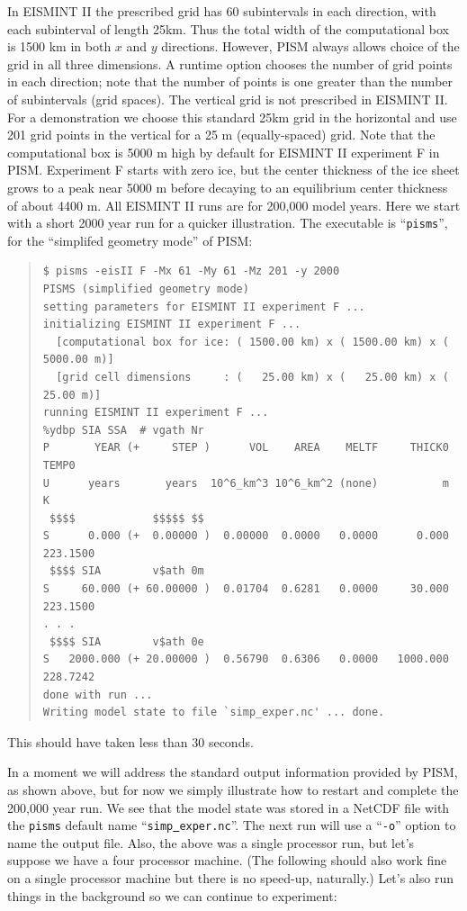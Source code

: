\documentclass[11pt,final]{amsart}
\renewcommand{\t}[1]{\texttt{#1}}
\begin{document}
In EISMINT II the prescribed grid has 60 subintervals in each direction, with each subinterval of length 25km.  Thus the total width of the computational box is 1500 km in both $x$ and $y$ directions.  However, PISM always allows choice of the grid in all three dimensions.  A runtime option chooses the number of grid points in each direction; note that the number of points is one greater than the number of subintervals (grid spaces).  The vertical grid is not prescribed in EISMINT II.  For a demonstration we choose this standard 25km grid in the horizontal and use 201 grid points in the vertical for a 25 m (equally-spaced) grid.  Note that the computational box is 5000 m high by default for EISMINT II experiment F in PISM.  Experiment F starts with zero ice, but the center thickness of the ice sheet grows to a peak near 5000 m before decaying to an equilibrium center thickness of about 4400 m.  All EISMINT II runs are for 200,000 model years.  Here we start with a short 2000 year run for a quicker illustration.  The executable is ``\t{pisms}'', for the ``simplifed geometry mode'' of PISM:

\small\begin{quote}\begin{verbatim}
$ pisms -eisII F -Mx 61 -My 61 -Mz 201 -y 2000
PISMS (simplified geometry mode)
setting parameters for EISMINT II experiment F ... 
initializing EISMINT II experiment F ... 
  [computational box for ice: ( 1500.00 km) x ( 1500.00 km) x ( 5000.00 m)]
  [grid cell dimensions     : (   25.00 km) x (   25.00 km) x (   25.00 m)]
running EISMINT II experiment F ...
%ydbp SIA SSA  # vgath Nr
P       YEAR (+     STEP )      VOL    AREA    MELTF     THICK0     TEMP0
U      years       years  10^6_km^3 10^6_km^2 (none)          m         K
 $$$$            $$$$$ $$
S      0.000 (+  0.00000 )  0.00000  0.0000   0.0000      0.000  223.1500
 $$$$ SIA        v$ath 0m
S     60.000 (+ 60.00000 )  0.01704  0.6281   0.0000     30.000  223.1500
. . .
 $$$$ SIA        v$ath 0e
S   2000.000 (+ 20.00000 )  0.56790  0.6306   0.0000   1000.000  228.7242
done with run ... 
Writing model state to file `simp_exper.nc' ... done.
\end{verbatim}
\end{quote}\normalsize
\noindent This should have taken less than 30 seconds.

In a moment we will address the standard output information provided by PISM, as shown above, but for now we simply illustrate how to restart and complete the 200,000 year run.  We see that the model state was stored in a NetCDF file with the \verb|pisms| default name ``\texttt{simp\underline{ }exper.nc}''.  The next run will use a ``\verb|-o|'' option to name the output file.  Also, the above was a single processor run, but let's suppose we have a four processor machine.  (The following should also work fine on a single processor machine but there is no speed-up, naturally.)  Let's also run things in the background so we can continue to experiment:
\end{document}
